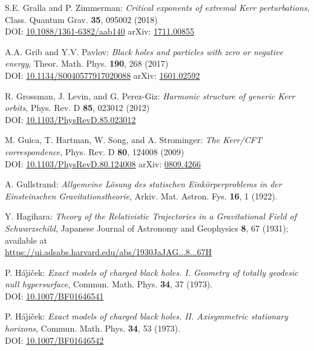 \begin{thebibliography}{123}
S.E. Gralla and P. Zimmerman:
{\em Critical exponents of extremal Kerr perturbations},
Class. Quantum Grav. {\bf 35}, 095002 (2018)\\
DOI: \href{https://doi.org/10.1088/1361-6382/aab140}{10.1088/1361-6382/aab140}\hfill
arXiv: \href{https://arxiv.org/abs/1711.00855}{1711.00855}

A.A. Grib and Y.V. Pavlov:
{\em Black holes and particles with zero or negative energy},
Theor. Math. Phys. {\bf 190}, 268 (2017)\\
DOI: \href{https://doi.org/10.1134/S0040577917020088}{10.1134/S0040577917020088}\hfill
arXiv: \href{https://arxiv.org/abs/1601.02592}{1601.02592}

R. Grossman, J. Levin, and G. Perez-Giz:
{\em Harmonic structure of generic Kerr orbits},
Phys. Rev. D {\bf 85}, 023012 (2012)\\
DOI: \href{https://doi.org/10.1103/PhysRevD.85.023012}{10.1103/PhysRevD.85.023012}

M. Guica, T. Hartman, W. Song, and A. Strominger:
{\em The Kerr/CFT correspondence},
Phys. Rev. D {\bf 80}, 124008 (2009)\\
DOI: \href{https://doi.org/10.1103/PhysRevD.80.124008}{10.1103/PhysRevD.80.124008}\hfill
arXiv: \href{https://arxiv.org/abs/0809.4266}{0809.4266}

A. Gullstrand:
\emph{Allgemeine Lösung des statischen Einkörperproblems in der Einsteinschen Gravitationstheorie},
Arkiv. Mat. Astron. Fys. {\bf 16}, 1 (1922).

Y. Hagihara:
\emph{Theory of the Relativistic Trajectories in a Gravitational Field of Schwarzschild},
Japanese Journal of Astronomy and Geophysics {\bf 8}, 67 (1931);
available at \\
\url{https://ui.adsabs.harvard.edu/abs/1930JaJAG...8...67H}

P. H\'a\'\j i\v{c}ek: {\em Exact models of charged black holes. I. Geometry
of totally geodesic null hypersurface},
Commun. Math. Phys. {\bf 34}, 37 (1973). \\
DOI: \href{https://doi.org/10.1007/BF01646541}{10.1007/BF01646541}

P. H\'a\'\j i\v{c}ek: {\em Exact models of charged black holes.
II. Axisymmetric stationary horizons},
Commun. Math. Phys. {\bf 34}, 53 (1973). \\
DOI: \href{https://doi.org/10.1007/BF01646542}{10.1007/BF01646542}


\end{thebibliography}
